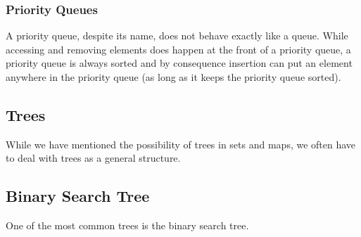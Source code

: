 \subsubsection{Priority Queues}

A priority queue, despite its name, does not behave exactly like a queue. While accessing and removing elements does happen at the front of a priority queue, a priority queue is always sorted and by consequence insertion can put an element anywhere in the priority queue (as long as it keeps the priority queue sorted).

\subsection{Trees}

While we have mentioned the possibility of trees in sets and maps, we often have to deal with trees as a general structure.

\subsection{Binary Search Tree}

One of the most common trees is the binary search tree.
